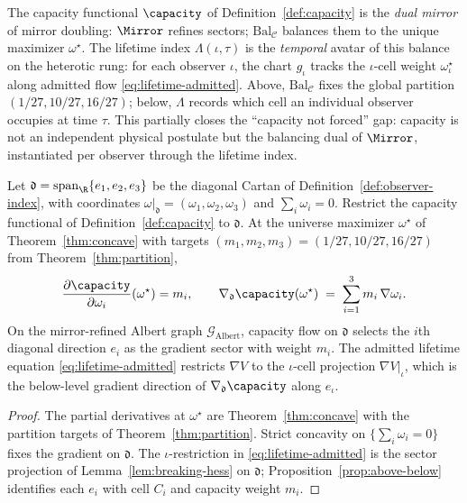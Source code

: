 \begin{proposition}
\label{prop:capacity-lifetime-dual}
The capacity functional $\capacity$ of Definition~\ref{def:capacity} is the
\emph{dual mirror} of mirror doubling: $\Mirror$ refines sectors;
$\mathrm{Bal}_{\mathcal{C}}$ balances them to the unique maximizer
$\omega^\star$. The lifetime index $\Lambda(\iota,\tau)$ is the
\emph{temporal} avatar of this balance on the heterotic rung: for each observer
$\iota$, the chart $g_\iota$ tracks the $\iota$-cell weight
$\omega^\star_\iota$ along admitted flow \eqref{eq:lifetime-admitted}. Above,
$\mathrm{Bal}_{\mathcal{C}}$ fixes the global partition $(1/27,10/27,16/27)$;
below, $\Lambda$ records which cell an individual observer occupies at time
$\tau$. This partially closes the ``capacity not forced'' gap: capacity is not
an independent physical postulate but the balancing dual of $\Mirror$,
instantiated per observer through the lifetime index.
\end{proposition}

\begin{lemma}
\label{lem:capacity-gradient-d}
Let $\mathfrak{d}=\mathrm{span}_\R\{e_1,e_2,e_3\}$ be the diagonal Cartan of
Definition~\ref{def:observer-index}, with coordinates
$\omega|_{\mathfrak{d}}=(\omega_1,\omega_2,\omega_3)$ and
$\sum_i\omega_i=0$. Restrict the capacity functional of
Definition~\ref{def:capacity} to $\mathfrak{d}$. At the universe maximizer
$\omega^\star$ of Theorem~\ref{thm:concave} with targets
$(m_1,m_2,m_3)=(1/27,10/27,16/27)$ from Theorem~\ref{thm:partition},
\begin{equation}\label{eq:capacity-gradient-d}
  \frac{\partial\capacity}{\partial\omega_i}(\omega^\star)=m_i,
  \qquad
  \nabla_{\mathfrak{d}}\capacity(\omega^\star)
  \;=\;
  \sum_{i=1}^3 m_i\,\nabla\omega_i.
\end{equation}
On the mirror-refined Albert graph $\mathcal{G}_{\mathrm{Albert}}$, capacity
flow on $\mathfrak{d}$ selects the $i$th diagonal direction $e_i$ as the
gradient sector with weight $m_i$. The admitted lifetime equation
\eqref{eq:lifetime-admitted} restricts $\nabla V$ to the $\iota$-cell projection
$\nabla V|_{\iota}$, which is the below-level gradient direction of
$\nabla_{\mathfrak{d}}\capacity$ along $e_\iota$.
\end{lemma}

\begin{proof}
The partial derivatives at $\omega^\star$ are Theorem~\ref{thm:concave} with
the partition targets of Theorem~\ref{thm:partition}. Strict concavity on
$\{\sum_i\omega_i=0\}$ fixes the gradient on $\mathfrak{d}$. The
$\iota$-restriction in \eqref{eq:lifetime-admitted} is the sector projection
of Lemma~\ref{lem:breaking-hess} on $\mathfrak{d}$; Proposition~\ref{prop:above-below}
identifies each $e_i$ with cell $C_i$ and capacity weight $m_i$.
\end{proof}


